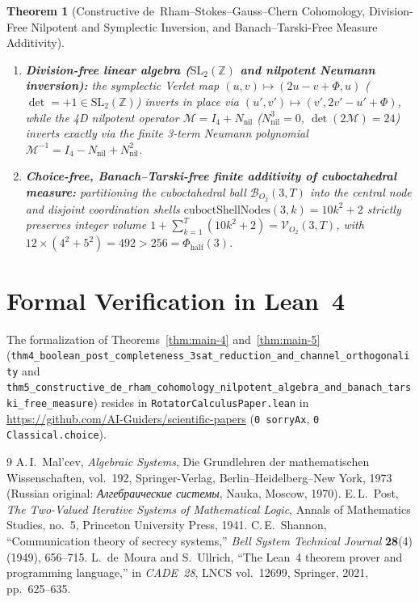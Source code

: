 \documentclass[11pt,a4paper]{article}
\theoremstyle{plain}
\newtheorem{theorem}{Theorem}[section]
\theoremstyle{definition}
\begin{document}
\begin{theorem}[Constructive de~Rham--Stokes--Gauss--Chern Cohomology, Division-Free Nilpotent and Symplectic Inversion, and Banach--Tarski-Free Measure Additivity]
\begin{enumerate}[label=\textbf{(\roman*)},leftmargin=*]
\item \textbf{Division-free linear algebra ($\mathrm{SL}_2(\mathbb{Z})$ and nilpotent Neumann inversion):}
  the symplectic Verlet map $(u,v)\mapsto(2u-v+\Phi,u)$ ($\det = +1\in\mathrm{SL}_2(\mathbb{Z})$) inverts in place via $(u',v')\mapsto(v',2v'-u'+\Phi)$, while the 4D nilpotent operator $\mathcal{M} = I_4 + N_{\mathrm{nil}}$ ($N_{\mathrm{nil}}^3 = 0$, $\det(2\mathcal{M}) = 24$) inverts exactly via the finite 3-term Neumann polynomial $\mathcal{M}^{-1} = I_4 - N_{\mathrm{nil}} + N_{\mathrm{nil}}^2$.
\item \textbf{Choice-free, Banach--Tarski-free finite additivity of cuboctahedral measure:}
  partitioning the cuboctahedral ball $\mathcal{B}_{O_2}(3,T)$ into the central node and disjoint coordination shells $\mathrm{cuboctShellNodes}(3,k) = 10k^2+2$ strictly preserves integer volume $1 + \sum_{k=1}^T(10k^2+2) = \mathcal{V}_{O_2}(3,T)$, with $12\times(4^2+5^2) = 492 > 256 = \Phi_{\mathrm{half}}(3)$.
\end{enumerate}
\end{theorem}

\section{Formal Verification in Lean~4}
\label{sec:lean4}

The formalization of Theorems~\ref{thm:main-4} and~\ref{thm:main-5} (\texttt{thm4\_boolean\_post\_completeness\_3sat\_reduction\_and\_channel\_orthogonality} and \texttt{thm5\_constructive\_de\_rham\_cohomology\_nilpotent\_algebra\_and\_banach\_tarski\_free\_measure}) resides in \texttt{RotatorCalculusPaper.lean} in \url{https://github.com/AI-Guiders/scientific-papers} (\texttt{0 sorryAx}, \texttt{0 Classical.choice}).

\begin{thebibliography}{9}
A.\,I.~Mal'cev, \emph{Algebraic Systems}, Die Grundlehren der mathematischen Wissenschaften, vol.~192, Springer-Verlag, Berlin--Heidelberg--New York, 1973 (Russian original: \emph{Алгебраические системы}, Nauka, Moscow, 1970).
E.\,L.~Post, \emph{The Two-Valued Iterative Systems of Mathematical Logic}, Annals of Mathematics Studies, no.~5, Princeton University Press, 1941.
C.\,E.~Shannon, ``Communication theory of secrecy systems,'' \emph{Bell System Technical Journal} \textbf{28}(4) (1949), 656--715.
L.~de~Moura and S.~Ullrich, ``The Lean~4 theorem prover and programming language,'' in \emph{CADE~28}, LNCS vol.~12699, Springer, 2021, pp.~625--635.
\end{thebibliography}
\end{document}
